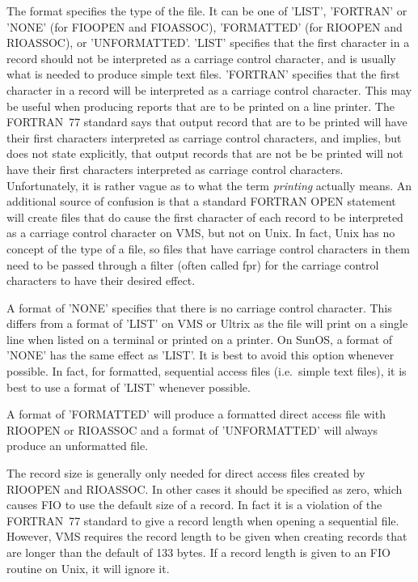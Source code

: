\documentclass[twoside,11pt]{article}
\renewcommand{\_}{\texttt{\symbol{95}}}
\begin{document}
The format specifies the type of the file. It can be one of 'LIST', 'FORTRAN'
or 'NONE' (for FIO\_OPEN and FIO\_ASSOC), 'FORMATTED' (for RIO\_OPEN and
RIO\_ASSOC), or 'UNFORMATTED'. 'LIST' specifies that the first character in a
record should not be interpreted as a carriage control character, and is
usually what is needed to produce simple text files. 'FORTRAN' specifies that
the first character in a record will be interpreted as a carriage control
character. This may be useful when producing reports that are to be printed on
a line printer. The FORTRAN~77 standard says that output record that are to be
printed will have their first characters interpreted as carriage control
characters, and implies, but does not state explicitly, that output records that
are not be be printed will not have their first characters interpreted as
carriage control characters. Unfortunately, it is rather vague as to what the
term {\em printing\/} actually means. An additional source of confusion is that
a standard FORTRAN OPEN statement will create files that do cause the first
character of each record to be interpreted as a carriage control character on
VMS, but not on Unix. In fact, Unix has no concept of the type of a file, so
files that have carriage control characters in them need to be passed through a
filter (often called fpr) for the carriage control characters to have their
desired effect.

A format of 'NONE' specifies that there is no carriage control character. This
differs from a format of 'LIST' on VMS or Ultrix as the file will print on a
single line when listed on a terminal or printed on a printer. On SunOS, a
format of 'NONE' has the same effect as 'LIST'. It is best to avoid this option
whenever possible. In fact, for formatted, sequential access files (i.e.\
simple text files), it is best to use a format of 'LIST' whenever possible.

A format of 'FORMATTED' will produce a formatted direct access file with
RIO\_OPEN or RIO\_ASSOC and a format of 'UNFORMATTED' will always produce an
unformatted file.

The record size is generally only needed for direct access files created by
RIO\_OPEN and RIO\_ASSOC. In other cases it should be specified as zero, which
causes FIO to use the default size of a record. In fact it is a violation of
the FORTRAN~77 standard to give a record length when opening a sequential file.
However, VMS requires the record length to be given when creating records that
are longer than the default of 133 bytes. If a record length is given to an FIO
routine on Unix, it will ignore it.
\end{document}
